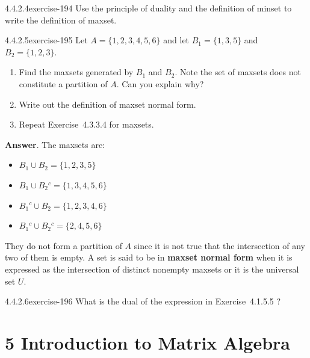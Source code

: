 \documentclass[twoside,10pt,]{book}
\newcommand{\terminology}[1]{\textbf{#1}}
\numberwithin{equation}{section}
\begin{document}
\begin{divisionsolution}{4.4.2.4}{}{exercise-194}%
\hypertarget{p-1684}{}%
Use the principle of duality and the definition of minset to write the definition of maxset.%
\end{divisionsolution}%
\begin{divisionsolution}{4.4.2.5}{}{exercise-195}%
\hypertarget{p-1685}{}%
Let \(A = \{1,2, 3,4, 5, 6\}\) and let \(B_1 = \{1, 3, 5\}\) and \(B _2 = \{1,2, 3\}\).%
\par
\hypertarget{p-1686}{}%
\leavevmode%
\begin{enumerate}[label=(\alph*)]
\item\hypertarget{li-894}{}\hypertarget{p-1687}{}%
Find the maxsets generated by \(B_1\) and \(B_2\). Note the set of maxsets does not constitute a partition of \(A\). Can you explain why?%
\item\hypertarget{li-895}{}\hypertarget{p-1688}{}%
Write out the definition of maxset normal form.%
\item\hypertarget{li-896}{}\hypertarget{p-1689}{}%
Repeat Exercise~4.3.3.4  for maxsets.%
\end{enumerate}
%
\par\smallskip%
\noindent\textbf{Answer}.\quad%
\hypertarget{p-1690}{}%
The maxsets are:%
\par
\hypertarget{p-1691}{}%
\leavevmode%
\begin{itemize}[label=\textbullet]
\item{}\hypertarget{p-1692}{}%
\(B_1\cup B_2=\{1,2,3,5\}\)%
\item{}\hypertarget{p-1693}{}%
\(B_1\cup B_2{}^c=\{1,3,4,5,6\}\)%
\item{}\hypertarget{p-1694}{}%
\(B_1{}^c\cup B_2=\{1,2,3,4,6\}\)%
\item{}\hypertarget{p-1695}{}%
\(B_1{}^c\cup B_2{}^c=\{2,4,5,6\}\)%
\end{itemize}
%
\par
\hypertarget{p-1696}{}%
They do not form a partition of \(A\) since it is not true that the intersection of any two of them is empty. A set is said to be in \terminology{maxset normal form} when it is expressed as the intersection of distinct nonempty maxsets or it is the universal set \(U\).%
\end{divisionsolution}%
\begin{divisionsolution}{4.4.2.6}{}{exercise-196}%
\hypertarget{p-1697}{}%
What is the dual of the expression in Exercise~4.1.5.5 ?%
\end{divisionsolution}%
\chapter*{5 Introduction to Matrix Algebra}
\end{document}

